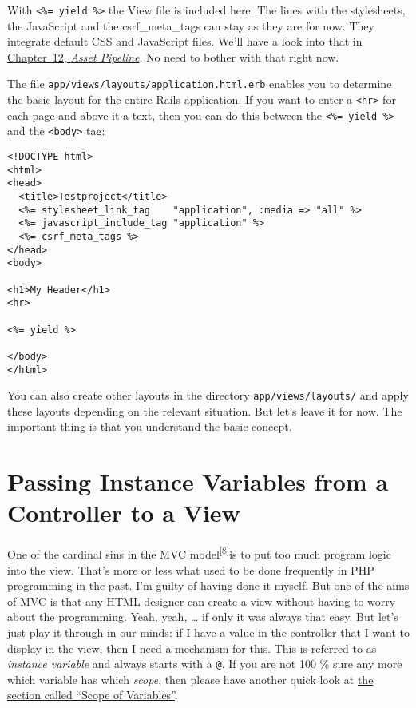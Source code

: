 \documentclass[a4paper]{book}
\newcommand{\chap}[1]{\newpage\thispagestyle{empty}\chapter{#1}\label{chap:\thechapter}}
\begin{document}
With \texttt{\textless{}\%= yield \%\textgreater{}} the View file is included here. The lines with the stylesheets, the JavaScript and the csrf\_meta\_tags can stay as they are for now. They integrate default CSS and JavaScript files. We'll have a look into that in \hyperref[assetux5fpipeline]{Chapter~12, \emph{Asset Pipeline}}. No need to bother with that right now.

The file \texttt{app/views/layouts/application.html.erb} enables you to determine the basic layout for the entire Rails application. If you want to enter a \texttt{\textless{}hr\textgreater{}} for each page and above it a text, then you can do this between the \texttt{\textless{}\%= yield \%\textgreater{}} and the \texttt{\textless{}body\textgreater{}} tag:

\begin{shaded}\begin{verbatim}
<!DOCTYPE html>
<html>
<head>
  <title>Testproject</title>
  <%= stylesheet_link_tag    "application", :media => "all" %>
  <%= javascript_include_tag "application" %>
  <%= csrf_meta_tags %>
</head>
<body>

<h1>My Header</h1>
<hr>

<%= yield %>

</body>
</html>
\end{verbatim}\end{shaded}

You can also create other layouts in the directory \texttt{app/views/layouts/} and apply these layouts depending on the relevant situation. But let's leave it for now. The important thing is that you understand the basic concept.

\chap{Passing Instance Variables from a Controller to a View}\label{passing-instance-variables-from-a-controller-to-a-view}

One of the cardinal sins in the MVC model\textsuperscript{{[}\hyperref[ftn.idp2617376]{8}{]}}is to put too much program logic into the view. That's more or less what used to be done frequently in PHP programming in the past. I'm guilty of having done it myself. But one of the aims of MVC is that any HTML designer can create a view without having to worry about the programming. Yeah, yeah, \ldots{} if only it was always that easy. But let's just play it through in our minds: if I have a value in the controller that I want to display in the view, then I need a mechanism for this. This is referred to as \emph{instance variable} and always starts with a \texttt{@}. If you are not 100 \% sure any more which variable has which \emph{scope}, then please have another quick look at \hyperref[scopeux5fvonux5fvariablen]{the section called “Scope of Variables”}.
\end{document}
